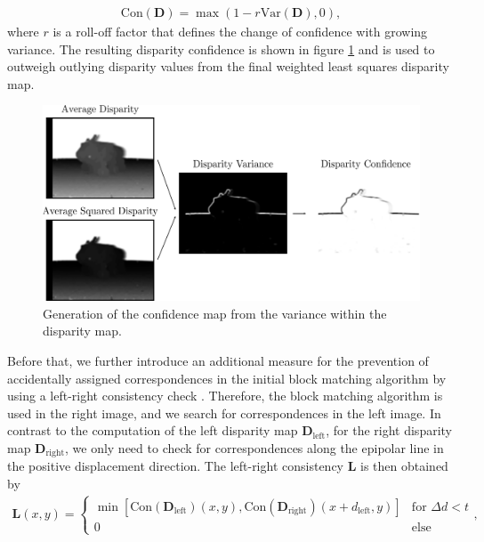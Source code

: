 \begin{align}
	\text{Con}(\bm{D}) = \max\left(1-r\text{Var}(\bm{D}),0\right),
\end{align}
where $r$ is a roll-off factor that defines the change of confidence with growing variance. The resulting disparity confidence is shown in figure \ref{fig::224_confidence_map} and is used to outweigh outlying disparity values from the final weighted least squares disparity map. 
\begin{figure}[h!]
	\centering
	\includegraphics[scale=.28]{chapters/03_principles_of_machine_learning/img/confidence_map.png}
	\caption{Generation of the confidence map from the variance within the disparity map.}
	\label{fig::224_confidence_map}
\end{figure}
Before that, we further introduce an additional measure for the prevention of accidentally assigned correspondences in the initial block matching algorithm by using a left-right consistency check \cite{egnal2004stereo}. Therefore, the block matching algorithm is used in the right image, and we search for correspondences in the left image. In contrast to the computation of the left disparity map $\bm{D}_\text{left}$, for the right disparity map $\bm{D}_\text{right}$, we only need to check for correspondences along the epipolar line in the positive displacement direction. The left-right consistency $\bm{L}$ is then obtained by 
\begin{align}
	\bm{L}(x, y) = 
	\begin{cases}
	\min \left[\text{Con}(\bm{D}_\text{left})(x, y), \text{Con}(\bm{D}_\text{right})(x + d_\text{left}, y)\right] & \text{for } \Delta d < t  \\
	0 & \text{else}
	\end{cases},
\end{align}
